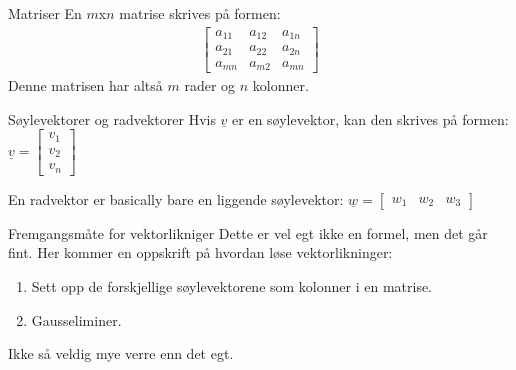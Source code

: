\documentclass[11pt, a4paper, norsk]{article}
\begin{document}
        
        \begin{Definition}{Matriser}{}
            En $m$x$n$ matrise skrives på formen:
            \begin{align}
                \begin{bmatrix}
                    a_{11} & a_{12} & a_{1n} \\
                    a_{21} & a_{22} & a_{2n} \\
                    a_{mn} & a_{m2} & a_{mn}
                \end{bmatrix}
            \end{align}
            Denne matrisen har altså $m$ rader og $n$ kolonner.
        \end{Definition}

        \begin{Definition}{Søylevektorer og radvektorer}{}
            Hvis $\underline{v}$ er en søylevektor, kan den skrives på formen:
            $\underline{v} = \begin{bmatrix}
                v_1 \\
                v_2 \\
                v_{n}
            \end{bmatrix}$

            En radvektor er basically bare en liggende søylevektor:
            $\underline{w} = \begin{bmatrix}
                w_1 & w_2 & w_3
            \end{bmatrix}$
        \end{Definition}


        \begin{Formel}{Fremgangsmåte for vektorlikniger}{}
            Dette er vel egt ikke en formel, men det går fint. Her kommer en oppskrift på hvordan løse vektorlikninger:
            \begin{enumerate}
                \item Sett opp de forskjellige søylevektorene som kolonner i en matrise.
                \item Gausseliminer.
            \end{enumerate}
            Ikke så veldig mye verre enn det egt.
        \end{Formel}
\end{document}
